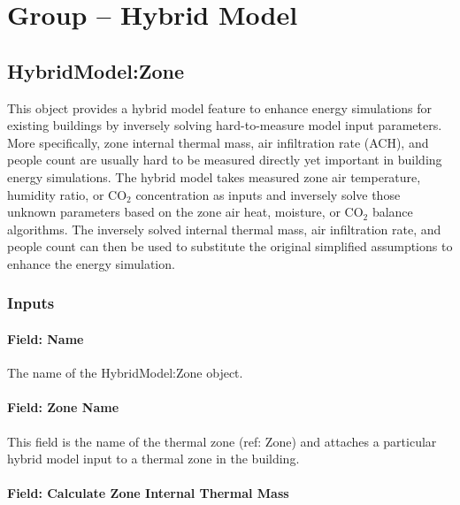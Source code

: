 \section{Group -- Hybrid Model}\label{group-hybrid-model}

\subsection{HybridModel:Zone}\label{inputs-hm}

This object provides a hybrid model feature to enhance energy simulations for existing buildings by inversely solving hard-to-measure model input parameters. More specifically, zone internal thermal mass, air infiltration rate (ACH), and people count are usually hard to be measured directly yet important in building energy simulations. The hybrid model takes measured zone air temperature, humidity ratio, or CO$_2$ concentration as inputs and inversely solve those unknown parameters based on the zone air heat, moisture, or CO$_2$ balance algorithms. The inversely solved internal thermal mass, air infiltration rate, and people count can then be used to substitute the original simplified assumptions to enhance the energy simulation.

\subsubsection{Inputs}\label{inputs-hybridzone}

\paragraph{Field: Name}\label{field-name-hm}

The name of the HybridModel:Zone object.

\paragraph{Field: Zone Name}\label{field-zone-name-hm}

This field is the name of the thermal zone (ref: Zone) and attaches a particular hybrid model input to a thermal zone in the building.

\paragraph{Field: Calculate Zone Internal Thermal Mass}\label{field-calculate-zone-internal-thermal-mass-hm}

